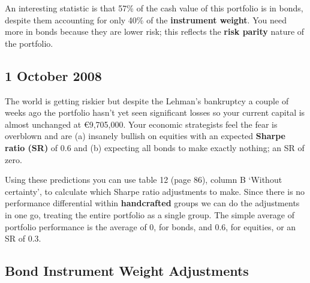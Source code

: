 An interesting statistic is that 57\% of the cash value of this portfolio is in bonds, despite them accounting for only 40\% of the \textbf{instrument weight}. You need more in bonds because they are lower risk; this reflects the \textbf{risk parity} nature of the portfolio.

\subsection*{1 October 2008}

The world is getting riskier but despite the Lehman's bankruptcy a couple of weeks ago the portfolio hasn't yet seen significant losses so your current capital is almost unchanged at €9,705,000. Your economic strategists feel the fear is overblown and are (a) insanely bullish on equities with an expected \textbf{Sharpe ratio (SR)} of 0.6 and (b) expecting all bonds to make exactly nothing; an SR of zero.

Using these predictions you can use table 12 (page 86), column B ‘Without certainty', to calculate which Sharpe ratio adjustments to make. Since there is no performance differential within \textbf{handcrafted} groups we can do the adjustments in one go, treating the entire portfolio as a single group. The simple average of portfolio performance is the average of 0, for bonds, and 0.6, for equities, or an SR of 0.3.

\subsection*{Bond Instrument Weight Adjustments}


